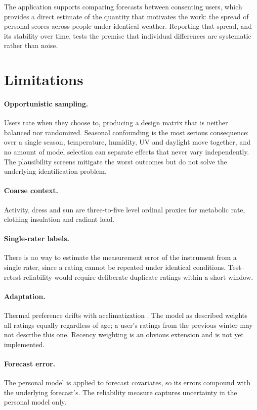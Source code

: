 \documentclass[11pt]{article}
\begin{document}
The application supports comparing forecasts between consenting users, which
provides a direct estimate of the quantity that motivates the work: the spread
of personal scores across people under identical weather. Reporting that
spread, and its stability over time, tests the premise that individual
differences are systematic rather than noise.

\section{Limitations}

\paragraph{Opportunistic sampling.} Users rate when they choose to, producing a
design matrix that is neither balanced nor randomized. Seasonal confounding is
the most serious consequence: over a single season, temperature, humidity, UV
and daylight move together, and no amount of model selection can separate
effects that never vary independently. The plausibility screens mitigate the
worst outcomes but do not solve the underlying identification problem.

\paragraph{Coarse context.} Activity, dress and sun are three-to-five level
ordinal proxies for metabolic rate, clothing insulation and radiant load.

\paragraph{Single-rater labels.} There is no way to estimate the measurement
error of the instrument from a single rater, since a rating cannot be repeated
under identical conditions. Test--retest reliability would require deliberate
duplicate ratings within a short window.

\paragraph{Adaptation.} Thermal preference drifts with acclimatization
\citep{dedear1998}. The model as described weights all ratings equally
regardless of age; a user's ratings from the previous winter may not describe
this one. Recency weighting is an obvious extension and is not yet implemented.

\paragraph{Forecast error.} The personal model is applied to forecast
covariates, so its errors compound with the underlying forecast's. The
reliability measure captures uncertainty in the personal model only.
\end{document}
